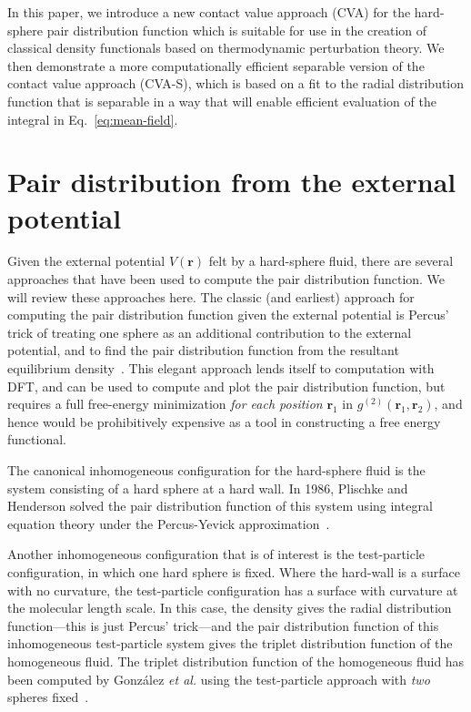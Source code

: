 \documentclass[letterpaper,twocolumn,amsmath,amssymb,pre,aps,10pt]{revtex4-1}
\newcommand{\rr}{\textbf{r}}
\begin{document}
In this paper, we introduce a new contact value approach (CVA) for
the hard-sphere pair distribution function which is suitable for use
in the creation of classical density functionals based on
thermodynamic perturbation theory. We then demonstrate a more
computationally efficient separable version of the contact
value approach (CVA-S), which is based on a fit to the radial
distribution function that is separable in a way that will enable
efficient evaluation of the integral in Eq.~\ref{eq:mean-field}.

\section{Pair distribution from the external potential}\label{sec:gV}

Given the external potential $V(\rr)$ felt by a hard-sphere fluid,
there are several approaches that have been used to compute the pair
distribution function.  We will review these approaches here.  The
classic (and earliest) approach for computing the pair distribution
function given the external potential is Percus' trick of treating one
sphere as an additional contribution to the external potential, and to
find the pair distribution function from the resultant equilibrium
density~\cite{hansen2006theory}.  This elegant approach lends itself
to computation with DFT, and can be used to compute and plot the pair
distribution function, but requires a full free-energy minimization
\emph{for each position} $\rr_1$ in $g^{(2)}(\rr_1,\rr_2)$, and hence
would be prohibitively expensive as a tool in constructing a free
energy functional.

The canonical inhomogeneous configuration for the hard-sphere fluid is
the system consisting of a hard sphere at a hard wall.  In 1986,
Plischke and Henderson solved the pair distribution function of this
system using integral equation theory under the Percus-Yevick
approximation~\cite{plischke1986pair}.

Another inhomogeneous configuration that is of interest is the
test-particle configuration, in which one hard sphere is fixed.  Where
the hard-wall is a surface with no curvature, the test-particle
configuration has a surface with curvature at the molecular length
scale.  In this case, the density gives the radial distribution
function---this is just Percus' trick---and the pair distribution
function of this inhomogeneous test-particle system gives the triplet
distribution function of the homogeneous fluid.  The triplet
distribution function of the homogeneous fluid has been computed by
Gonz\'alez \emph{et al.} using the test-particle approach with
\emph{two} spheres fixed~\cite{gonzalez1999test}.
\end{document}
